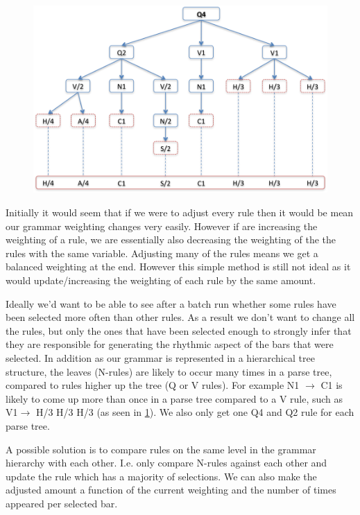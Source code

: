 \documentclass[pdftex,12pt,a4paper]{report}
\begin{document}
\begin{figure}[here]
  \centering
  \includegraphics[scale=0.85]{figure/q4exampleparsetree.png}
  \label{fig:q4exampleparsetree}
\end{figure}

Initially it would seem that if we were to adjust every rule then it would be mean our grammar weighting changes very easily. However if are increasing the weighting of a rule, we are essentially also decreasing the weighting of the the rules with the same variable. Adjusting many of the rules means we get a balanced weighting at the end. However this simple method is still not ideal as it would update/increasing the weighting of each rule by the same amount.

Ideally we'd want to be able to see after a batch run whether some rules have been selected more often than other rules. As a result we don't want to change all the rules, but only the ones that have been selected enough to strongly infer that they are responsible for generating the rhythmic aspect of the bars that were selected. In addition as our grammar is represented in a hierarchical tree structure, the leaves (N-rules) are likely to occur many times in a parse tree, compared to rules higher up the tree (Q or V rules). For example N1 $\rightarrow$ C1 is likely to come up more than once in a parse tree compared to a V rule, such as V1$\rightarrow$ H/3 H/3 H/3 (as seen in \ref{fig:q4exampleparsetree}). We also only get one Q4 and Q2 rule for each parse tree. 

A possible solution is to compare rules on the same level in the grammar hierarchy with each other. I.e. only compare N-rules against each other and update the rule which has a majority of selections. We can also make the adjusted amount a function of the current weighting and the number of times appeared per selected bar.
\end{document}
